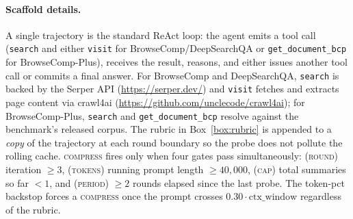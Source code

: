 \documentclass{article}
\begin{document}
\paragraph{Scaffold details.} A single trajectory is the standard ReAct
loop: the agent emits a tool call (\texttt{search} and either
\texttt{visit} for BrowseComp/DeepSearchQA or
\texttt{get\_document\_bcp} for BrowseComp-Plus), receives the result,
reasons, and either issues another tool call or commits a final answer.
For BrowseComp and DeepSearchQA, \texttt{search} is backed by the
Serper API (\url{https://serper.dev/}) and \texttt{visit} fetches and
extracts page content via crawl4ai
(\url{https://github.com/unclecode/crawl4ai}); for BrowseComp-Plus,
\texttt{search} and \texttt{get\_document\_bcp} resolve against the
benchmark's released corpus.
The rubric in Box~\ref{box:rubric} is appended to a \emph{copy} of the
trajectory at each round boundary so the probe does not pollute the
rolling cache. \textsc{compress} fires only when four gates pass
simultaneously: (\textsc{round}) iteration $\geq 3$,
(\textsc{tokens}) running prompt length $\geq 40{,}000$,
(\textsc{cap}) total summaries so far $< 1$, and (\textsc{period})
$\geq 2$ rounds elapsed since the last probe. The token-pct backstop
forces a \textsc{compress} once the prompt crosses $0.30 \cdot
\text{ctx\_window}$ regardless of the rubric.
\end{document}
